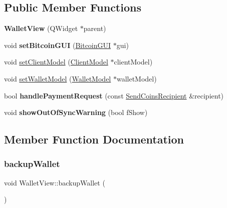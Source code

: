\subsection*{Public Member Functions}
\begin{DoxyCompactItemize}
\item 
\mbox{\label{class_wallet_view_a015da635646a47196bbcd819f7e01e7c}} 
{\bfseries Wallet\+View} (Q\+Widget $\ast$parent)
\item 
\mbox{\label{class_wallet_view_a4405b0cf33d31ea663cb1e5047ae1d97}} 
void {\bfseries set\+Bitcoin\+G\+UI} (\mbox{\hyperlink{class_bitcoin_g_u_i}{Bitcoin\+G\+UI}} $\ast$gui)
\item 
void \mbox{\hyperlink{class_wallet_view_a46d9a8d93adfdcc29cae9ff0d44c313e}{set\+Client\+Model}} (\mbox{\hyperlink{class_client_model}{Client\+Model}} $\ast$client\+Model)
\item 
void \mbox{\hyperlink{class_wallet_view_a0a37ff693a4f9c1e5ddc23f9cd3913be}{set\+Wallet\+Model}} (\mbox{\hyperlink{class_wallet_model}{Wallet\+Model}} $\ast$wallet\+Model)
\item 
\mbox{\label{class_wallet_view_a0ae21d91a9d7755026ce2a6846cef68d}} 
bool {\bfseries handle\+Payment\+Request} (const \mbox{\hyperlink{class_send_coins_recipient}{Send\+Coins\+Recipient}} \&recipient)
\item 
\mbox{\label{class_wallet_view_af3ed06b191b6d933788f32ed2daa5fae}} 
void {\bfseries show\+Out\+Of\+Sync\+Warning} (bool f\+Show)
\end{DoxyCompactItemize}


\subsection{Member Function Documentation}
\mbox{\label{class_wallet_view_a9800d793b552076b4207276d9e08c8b6}} 
\subsubsection{\texorpdfstring{backupWallet}{backupWallet}}
{\footnotesize\ttfamily void Wallet\+View\+::backup\+Wallet (\begin{DoxyParamCaption}{ }\end{DoxyParamCaption})\hspace{0.3cm}{\ttfamily [slot]}}


